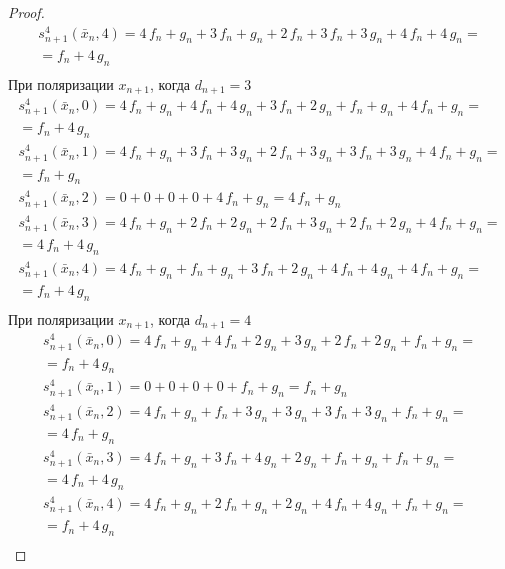 \documentclass[bibliography=totoc, a4paper, 14pt]{extarticle}
\begin{document}
\begin{proof}
$$\begin{array}{l}
s_{n+1}^4(\bar{x}_n, 4) = 4\,f_n + g_n + 3\,f_n + g_n + 2\,f_n + 3\,f_n + 3\,g_n + 4\,f_n + 4\,g_n =\\
= f_n + 4\,g_n \\
\end{array}$$
При поляризации $x_{n+1}$, когда $d_{n+1} = 3$
$$\begin{array}{l}
s_{n+1}^4(\bar{x}_n, 0) = 4\,f_n + g_n + 4\,f_n + 4\,g_n + 3\,f_n + 2\,g_n + f_n + g_n + 4\,f_n + g_n =\\
= f_n + 4\,g_n \\
s_{n+1}^4(\bar{x}_n, 1) = 4\,f_n + g_n + 3\,f_n + 3\,g_n + 2\,f_n + 3\,g_n + 3\,f_n + 3\,g_n + 4\,f_n + g_n =\\
= f_n + g_n \\
s_{n+1}^4(\bar{x}_n, 2) = 0 + 0 + 0 + 0 + 4\,f_n + g_n = 4\,f_n + g_n \\
s_{n+1}^4(\bar{x}_n, 3) = 4\,f_n + g_n + 2\,f_n + 2\,g_n + 2\,f_n + 3\,g_n + 2\,f_n + 2\,g_n + 4\,f_n + g_n =\\
= 4\,f_n + 4\,g_n \\
s_{n+1}^4(\bar{x}_n, 4) = 4\,f_n + g_n + f_n + g_n + 3\,f_n + 2\,g_n + 4\,f_n + 4\,g_n + 4\,f_n + g_n =\\
= f_n + 4\,g_n \\
\end{array}$$
При поляризации $x_{n+1}$, когда $d_{n+1} = 4$
$$\begin{array}{l}
s_{n+1}^4(\bar{x}_n, 0) = 4\,f_n + g_n + 4\,f_n + 2\,g_n + 3\,g_n + 2\,f_n + 2\,g_n + f_n + g_n =\\
= f_n + 4\,g_n \\
s_{n+1}^4(\bar{x}_n, 1) = 0 + 0 + 0 + 0 + f_n + g_n = f_n + g_n \\
s_{n+1}^4(\bar{x}_n, 2) = 4\,f_n + g_n + f_n + 3\,g_n + 3\,g_n + 3\,f_n + 3\,g_n + f_n + g_n =\\
= 4\,f_n + g_n \\
s_{n+1}^4(\bar{x}_n, 3) = 4\,f_n + g_n + 3\,f_n + 4\,g_n + 2\,g_n + f_n + g_n + f_n + g_n =\\
= 4\,f_n + 4\,g_n \\
s_{n+1}^4(\bar{x}_n, 4) = 4\,f_n + g_n + 2\,f_n + g_n + 2\,g_n + 4\,f_n + 4\,g_n + f_n + g_n =\\
= f_n + 4\,g_n \\
\end{array}$$

\end{proof}
\end{document}
